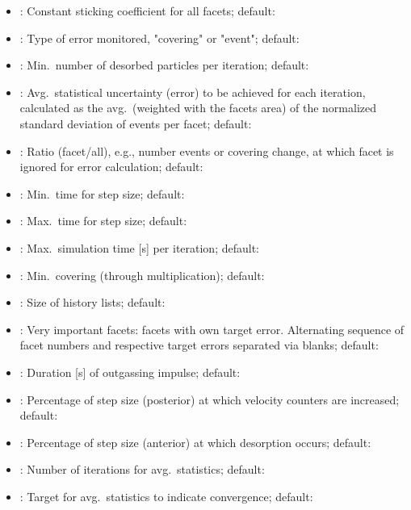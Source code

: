 \begin{itemize}[noitemsep,topsep=0pt, partopsep=0pt]
\item {}: Constant sticking coefficient for all facets; default:
\item {}: Type of error monitored, "covering" or "event"; default: 
\item {}: Min.\ number of desorbed particles per iteration; default: 
\item {}: Avg.\ statistical uncertainty (error) to be achieved for each iteration, calculated as the avg.\ (weighted with the facets area) of the normalized standard deviation of events per facet; default: 
\item {}: Ratio (facet/all), e.g., number events or covering change, at which facet is ignored for error calculation; default: 
\item {}: Min.\ time for step size; default:
\item {}: Max.\ time for step size; default:
\item {}: Max.\ simulation time [s] per iteration; default:
\item {}: Min.\ covering (through multiplication); default:
\item {}: Size of history lists; default:
\item {}: Very important facets: facets with own target error. Alternating sequence of facet numbers and respective target errors separated via blanks; default:\codew{[]}
\item {}: Duration [s] of outgassing impulse; default: 
\item {}: Percentage of step size (posterior) at which velocity counters are increased; default: 
\item {}: Percentage of step size (anterior) at which desorption occurs; default: 
\item {}: Number of iterations for avg.\ statistics; default: 
\item {}: Target for avg.\ statistics to indicate convergence; default: 

\end{itemize}
